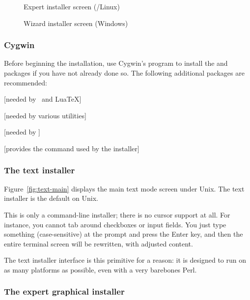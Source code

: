 \documentclass{article}
\begin{document}
\begin{figure}[tb]
\caption{Expert \GUI{} installer screen (\GNU/Linux)}\label{fig:gui-main}
\end{figure}

\begin{figure}[tb]
\caption{Wizard installer screen (Windows)}\label{fig:wizard-w32}
\end{figure}


\subsubsection{Cygwin}
\label{sec:cygwin}

Before beginning the installation, use Cygwin's  program to
install the  and  packages if you have
not already done so.  The following additional packages are
recommended:
\begin{itemize*}
\item {} [needed by \XeTeX\ and Lua\TeX]
\item {} [needed by various utilities]
\item {} [needed by ]
\item {} [provides the  command used by the installer]
\end{itemize*}


\subsubsection{The text installer}

Figure~\ref{fig:text-main} displays the main text mode screen under
Unix.  The text installer is the default on Unix.

This is only a command-line installer; there is no cursor support at
all.  For instance, you cannot tab around checkboxes or input fields.
You just type something (case-sensitive) at the prompt and press the
Enter key, and then the entire terminal screen will be rewritten, with
adjusted content.

The text installer interface is this primitive for a reason: it
is designed to run on as many platforms as possible, even with a
very barebones Perl.

\subsubsection{The expert graphical installer}
\end{document}
